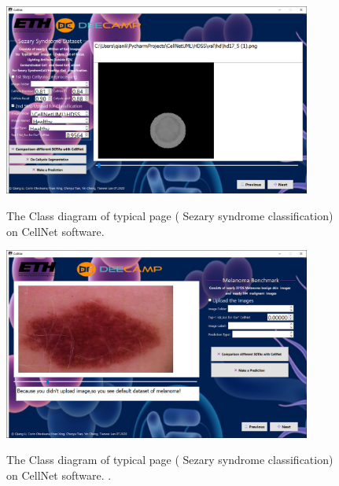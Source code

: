 \begin{figure}[t]
\begin{center}
\includegraphics[height=0.35\textheight,width=0.9\textwidth]{thesis-template-master/images/cellnet5-3page.PNG}
\label{fig:cellnet}
\end{center}
\caption{ The Class diagram of typical page ( Sezary syndrome classification) on CellNet software.}
\end{figure}


\begin{figure}[t]
\begin{center}
\includegraphics[height=0.35\textheight,width=0.9\textwidth]{thesis-template-master/images/cellnet6-1page.PNG}
\label{fig:cellnet}
\end{center}
\caption{ The Class diagram of typical page ( Sezary syndrome classification) on CellNet software. .}
\end{figure}


